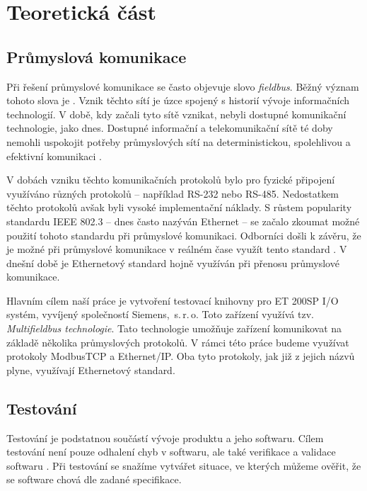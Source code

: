 \chapter{Teoretická část} %

\section{Průmyslová komunikace}

Při řešení průmyslové komunikace se často objevuje slovo \textit{fieldbus}. Běžný význam tohoto slova je  \cite{fieldbus_thomesse}. Vznik těchto sítí je úzce spojený s historií vývoje informačních technologií. V době, kdy začali tyto sítě vznikat, nebyli dostupné komunikační technologie, jako dnes. Dostupné informační a telekomunikační sítě té doby nemohli uspokojit potřeby průmyslových sítí na deterministickou, spolehlivou a efektivní komunikaci \cite{future_of_ind_com}. 

V dobách vzniku těchto komunikačních protokolů bylo pro fyzické připojení využíváno různých protokolů -- například RS-232 nebo RS-485. Nedostatkem těchto protokolů avšak byli vysoké implementační náklady. S růstem popularity standardu IEEE 802.3 -- dnes často nazýván Ethernet -- se začalo zkoumat možné použití tohoto standardu při průmyslové komunikaci. Odborníci došli k závěru, že je možné při průmyslové komunikace v reálném čase využít tento standard \cite{lee_ethernet_fieldbus}. V dnešní době je Ethernetový standard hojně využíván při přenosu průmyslové komunikace.

Hlavním cílem naší práce je vytvoření testovací knihovny pro ET 200SP I/O systém, vyvíjený společností Siemens,~s.\,{}r.\,{}o. Toto zařízení využívá tzv. \textit{Multifieldbus technologie}. Tato technologie umožňuje zařízení komunikovat na základě několika průmyslových protokolů. V rámci této práce budeme využívat protokoly ModbusTCP a Ethernet/IP. Oba tyto protokoly, jak již z jejich názvů plyne, využívají Ethernetový standard.  


\section{Testování}

Testování je podstatnou součástí vývoje produktu a jeho softwaru. Cílem testování není pouze odhalení chyb v softwaru, ale také verifikace a validace softwaru \cite{singh2012software}. Při testování se snažíme vytvářet situace, ve kterých můžeme ověřit, že se software chová dle zadané specifikace.

